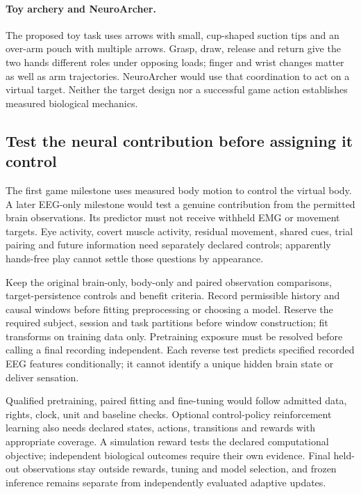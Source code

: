 \paragraph{Toy archery and NeuroArcher.}
The proposed toy task uses arrows with small, cup-shaped suction tips and an
over-arm pouch with multiple arrows.
Grasp, draw, release and return give the two hands different roles under opposing
loads; finger and wrist changes matter as well as arm trajectories. NeuroArcher
would use that coordination to act on a virtual target. Neither the target
design nor a successful game action establishes measured biological mechanics.

\subsection{Test the neural contribution before assigning it control}

The first game milestone uses measured body motion to control the virtual body.
A later EEG-only milestone would test a genuine contribution from the permitted
brain observations. Its predictor must not receive withheld EMG or movement
targets. Eye activity, covert muscle activity, residual movement, shared cues,
trial pairing and future information need separately declared controls;
apparently hands-free play cannot settle those questions by appearance.

Keep the original brain-only, body-only and paired observation comparisons,
target-persistence controls and benefit criteria. Record permissible history and
causal windows before fitting preprocessing or choosing a model. Reserve the
required subject, session and task partitions before window construction; fit
transforms on training data only. Pretraining exposure must be resolved before
calling a final recording independent. Each reverse test predicts specified
recorded EEG features conditionally; it cannot identify a unique hidden brain
state or deliver sensation.

Qualified pretraining, paired fitting and fine-tuning would follow admitted data,
rights, clock, unit and baseline checks. Optional control-policy reinforcement
learning also needs declared states, actions, transitions and rewards with
appropriate coverage. A simulation reward tests the declared computational
objective; independent biological outcomes require their own evidence. Final
held-out observations stay outside rewards, tuning and model selection, and
frozen inference remains separate from independently evaluated adaptive updates.

